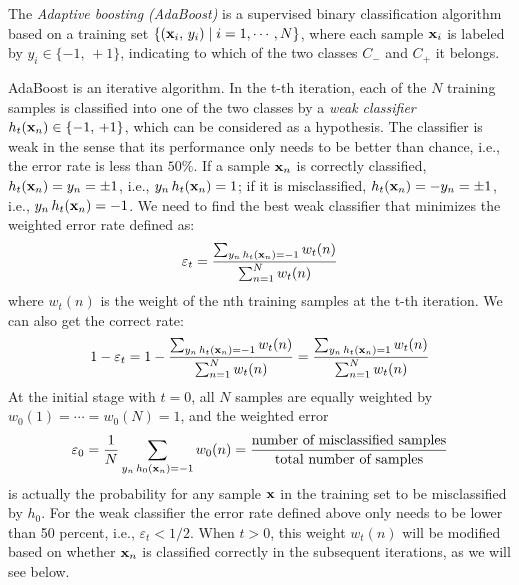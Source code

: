 \documentclass{article}
\begin{document}

The {\em Adaptive boosting (AdaBoost)} is a supervised binary 
classification algorithm based on a training set 
$\{ ({\bf x}_i,\,y_i)\;|\;i=1,\cdots,N\}$, where each sample 
${\bf x}_i$ is labeled by $y_i\in\{-1,\,+1\}$, indicating to which 
of the two classes $C_-$ and $C_+$ it belongs. 

AdaBoost is an iterative algorithm. In the t-th iteration, each of 
the $N$ training samples is classified into one of the two classes
by a {\em weak classifier} $h_t({\bf x}_n)\in\{-1,\,+1\}$, which can
be considered as a hypothesis. The classifier is weak in the sense 
that its performance only needs to be better than chance, i.e., the 
error rate is less than $50\%$. If a sample ${\bf x}_n$ is correctly 
classified, $h_t({\bf x}_n)=y_n=\pm 1$, i.e., $y_n\,h_t({\bf x}_n)=1$;
if it is misclassified, $h_t({\bf x}_n)=-y_n=\pm 1$, i.e., 
$y_n\,h_t({\bf x}_n)=-1$. We need to find the best weak classifier
that minimizes the weighted error rate defined as:
\begin{equation}
  \varepsilon_t=\frac{\sum_{y_n\,h_t({\bf x}_n)=-1} w_t(n)}{\sum_{n=1}^N w_t(n)}
\end{equation}
where $w_t(n)$ is the weight of the nth training samples at the t-th 
iteration. We can also get the correct rate:
\begin{equation}
  1-\varepsilon_t=1-\frac{\sum_{y_n\,h_t({\bf x}_n)=-1} w_t(n)}{\sum_{n=1}^N w_t(n)}
  =\frac{\sum_{y_n\,h_t({\bf x}_n)=1} w_t(n)}{\sum_{n=1}^N w_t(n)}
\end{equation}
At the initial stage with $t=0$, all $N$ samples are equally 
weighted by $w_0(1)=\cdots=w_0(N)=1$, and the weighted error 
\begin{equation}
  \varepsilon_0=\frac{1}{N} \sum_{y_n\,h_0({\bf x}_n)=-1} w_0(n)
  =\frac{\mbox{number of misclassified samples}}
  {\mbox{total number of samples}}
\end{equation}
is actually the probability for any sample ${\bf x}$ in the training
set to be misclassified by $h_0$. For the weak classifier the error 
rate defined above only needs to be lower than 50 percent, i.e., 
$\varepsilon_t<1/2$. When $t>0$, this weight $w_t(n)$ will be modified
based on whether ${\bf x}_n$ is classified correctly in the subsequent
iterations, as we will see below.
\end{document}
